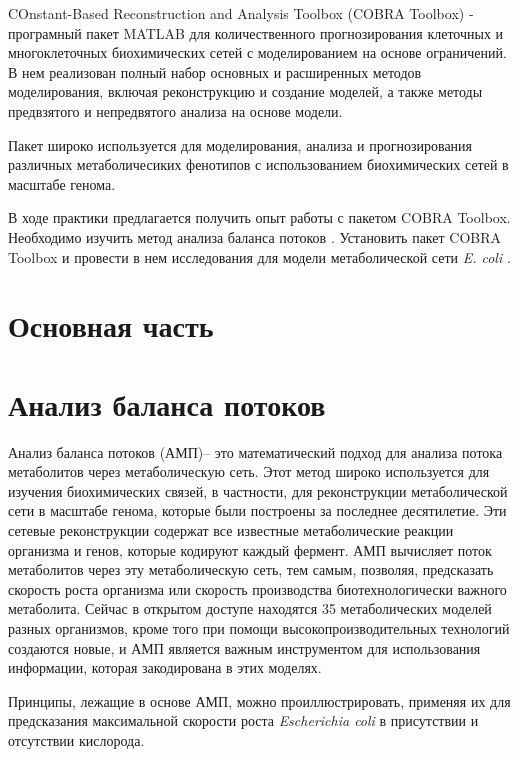 \documentclass[a4paper, 12pt]{article}
\begin{document}
COnstant-Based Reconstruction and Analysis Toolbox (COBRA Toolbox) - програмный пакет MATLAB для количественного прогнозирования клеточных и многоклеточных биохимических сетей с моделированием на основе ограничений. В нем реализован полный набор основных и расширенных методов моделирования, включая реконструкцию и создание моделей, а также методы предвзятого и непредвятого анализа на основе модели.

Пакет широко используется для моделирования, анализа и прогнозирования различных метаболичесиких фенотипов с использованием биохимических сетей в масштабе генома.
 
В ходе практики предлагается получить опыт работы с пакетом COBRA Toolbox. Необходимо изучить метод анализа баланса потоков \cite{litlink3}. Установить пакет COBRA Toolbox \cite{litlink1} и провести в нем исследования для модели метаболической сети \textit{E. coli} \cite{litlink2}.

\newpage
\section*{Основная часть}

\section{Анализ баланса потоков}

Анализ баланса потоков (АМП)– это математический подход для анализа потока метаболитов через метаболическую сеть. Этот метод широко используется для изучения биохимических связей, в частности, для реконструкции метаболической сети в масштабе генома, которые были построены за последнее десятилетие. Эти сетевые реконструкции содержат все известные метаболические реакции организма и генов, которые кодируют каждый фермент. АМП вычисляет поток метаболитов через эту метаболическую сеть, тем самым, позволяя, предсказать скорость роста организма или скорость производства биотехнологически важного метаболита. Сейчас в открытом доступе находятся 35 метаболических моделей разных организмов, кроме того при помощи высокопроизводительных технологий создаются новые, и АМП является важным инструментом для использования информации, которая закодирована в этих моделях. \cite{litlink3}

Принципы, лежащие в основе АМП, можно проиллюстрировать, применяя их для предсказания максимальной скорости роста \textit{Escherichia coli} в присутствии и отсутствии кислорода.
\end{document}
